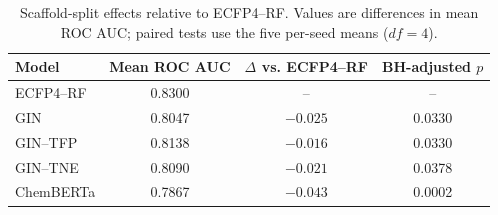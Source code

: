 \begin{table}[ht!]
\centering
\caption{Scaffold-split effects relative to ECFP4--RF. Values are differences in mean ROC AUC; paired tests use the five per-seed means ($df=4$).}
\label{tab:effect_summary}
\begin{tabular}{lccc}
\toprule
Model & Mean ROC AUC & $\Delta$ vs. ECFP4--RF & BH-adjusted $p$ \\
\midrule
ECFP4--RF & \num{0.8300} & {--} & {--} \\
GIN & \num{0.8047} & $-\num{0.025}$ & \num{0.0330} \\
GIN--TFP & \num{0.8138} & $-\num{0.016}$ & \num{0.0330} \\
GIN--TNE & \num{0.8090} & $-\num{0.021}$ & \num{0.0378} \\
ChemBERTa & \num{0.7867} & $-\num{0.043}$ & \num{0.0002} \\
\bottomrule
\end{tabular}
\end{table}

